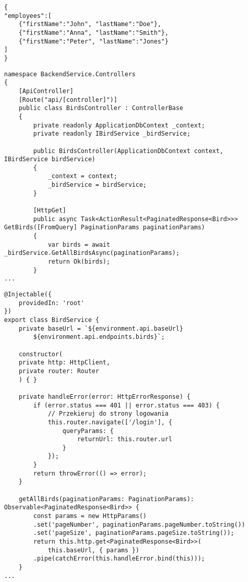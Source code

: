 \begin{lstlisting}[style=tsstyle, caption=Przykład danych w formacie JSON]
{
"employees":[
	{"firstName":"John", "lastName":"Doe"},
	{"firstName":"Anna", "lastName":"Smith"},
	{"firstName":"Peter", "lastName":"Jones"}
]
}
\end{lstlisting}

\begin{lstlisting}[style=csharp, caption={Fragment kontrolera REST API z projektu}, label={lst:przykladCSController}]
namespace BackendService.Controllers
{
	[ApiController]
	[Route("api/[controller]")]
	public class BirdsController : ControllerBase
	{
		private readonly ApplicationDbContext _context;
		private readonly IBirdService _birdService;

		public BirdsController(ApplicationDbContext context, IBirdService birdService)
		{
			_context = context;
			_birdService = birdService;
		}

		[HttpGet]
		public async Task<ActionResult<PaginatedResponse<Bird>>> GetBirds([FromQuery] PaginationParams paginationParams)
		{
			var birds = await _birdService.GetAllBirdsAsync(paginationParams);
			return Ok(birds);
		}
...
\end{lstlisting}

\pagebreak

\begin{lstlisting}[style=tsstyle, caption={Fragment serwisu po stronie frontendu}, label={lst:przykladTSService}]
@Injectable({
	providedIn: 'root'
})
export class BirdService {
	private baseUrl = `${environment.api.baseUrl}
		${environment.api.endpoints.birds}`;
	
	constructor(
	private http: HttpClient,
	private router: Router
	) { }
	
	private handleError(error: HttpErrorResponse) {
		if (error.status === 401 || error.status === 403) {
			// Przekieruj do strony logowania
			this.router.navigate(['/login'], { 
				queryParams: { 
					returnUrl: this.router.url 
				}
			});
		}
		return throwError(() => error);
	}
	
	getAllBirds(paginationParams: PaginationParams): Observable<PaginatedResponse<Bird>> {
		const params = new HttpParams()
		.set('pageNumber', paginationParams.pageNumber.toString())
		.set('pageSize', paginationParams.pageSize.toString());
		return this.http.get<PaginatedResponse<Bird>>(
			this.baseUrl, { params })
		.pipe(catchError(this.handleError.bind(this)));
	}
...
\end{lstlisting}


